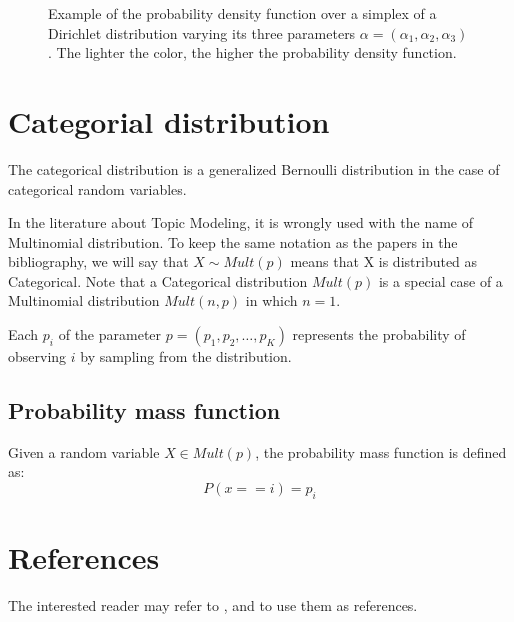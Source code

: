 \begin{figure}[h]
    \centering
    \hfill
    \caption{Example of the probability density function over a simplex of a Dirichlet distribution varying its three parameters $\alpha = (\alpha_1, \alpha_2, \alpha_3)$. The lighter the color, the higher the probability density function.}
    \label{fig:dirparams}
\end{figure}

\section{Categorial distribution}
The categorical distribution is a generalized Bernoulli distribution in the case of categorical random variables.

In the literature about Topic Modeling, it is wrongly used with the name of Multinomial distribution.
To keep the same notation as the papers in the bibliography, we will say that $X \sim \mathit{Mult}(p)$ means that X is distributed as Categorical.
Note that a Categorical distribution $\mathit{Mult}(p)$ is a special case of a Multinomial distribution $\mathit{Mult}(n, p)$ in which $n=1$.

Each $p_i$ of the parameter $p = (p_1, p_2, \dots, p_K)$ represents the probability of observing $i$ by sampling from the distribution.

\subsection{Probability mass function}
Given a random variable $X \in \mathit{Mult}(p)$, the probability mass function is defined as:
$$P(x == i) = p_i$$

\section{References}
The interested reader may refer to \cite{Gupta2011}, \cite{DBLP:journals/jmlr/BleiNJ03} and \cite{Seber2011} to use them as references.